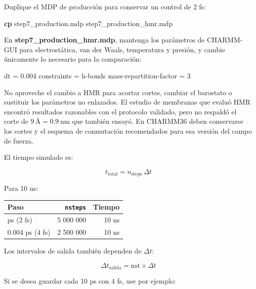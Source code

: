 \documentclass[
  spanish,
  11pt,
  a4paper]{article}
\newenvironment{Shaded}{\begin{snugshade}}{\end{snugshade}}
\newcommand{\DataTypeTok}[1]{\textcolor[rgb]{0.13,0.29,0.53}{#1}}
\newcommand{\DecValTok}[1]{\textcolor[rgb]{0.00,0.00,0.81}{#1}}
\newcommand{\FloatTok}[1]{\textcolor[rgb]{0.00,0.00,0.81}{#1}}
\newcommand{\FunctionTok}[1]{\textcolor[rgb]{0.13,0.29,0.53}{\textbf{#1}}}
\newcommand{\NormalTok}[1]{#1}
\newcommand{\OtherTok}[1]{\textcolor[rgb]{0.56,0.35,0.01}{#1}}
\newcommand{\StringTok}[1]{\textcolor[rgb]{0.31,0.60,0.02}{#1}}
\newcounter{none} %
\begin{document}
Duplique el MDP de producción para conservar un control de 2 fs:

\begin{Shaded}
\begin{Highlighting}[]
\FunctionTok{cp}\NormalTok{ step7\_production.mdp step7\_production\_hmr.mdp}
\end{Highlighting}
\end{Shaded}

En \textbf{step7\_production\_hmr.mdp}, mantenga los parámetros de
CHARMM-GUI para electrostática, van der Waals, temperatura y presión, y
cambie únicamente lo necesario para la comparación:

\begin{Shaded}
\begin{Highlighting}[]
\DataTypeTok{dt                      }\OtherTok{=}\StringTok{ }\FloatTok{0.004}
\DataTypeTok{constraints             }\OtherTok{=}\StringTok{ h{-}bonds}
\DataTypeTok{mass{-}repartition{-}factor }\OtherTok{=}\StringTok{ }\DecValTok{3}
\end{Highlighting}
\end{Shaded}

No aproveche el cambio a HMR para acortar cortes, cambiar el barostato o
sustituir los parámetros no enlazados. El estudio de membranas que
evaluó HMR encontró resultados razonables con el protocolo validado,
pero no respaldó el corte de \(9\ \text{Å}=0.9\ \mathrm{nm}\) que
también ensayó. En CHARMM36 deben conservarse los cortes y el esquema de
conmutación recomendados para esa versión del campo de fuerza.

El tiempo simulado es:

\[
t_{\mathrm{total}}=n_{\mathrm{steps}}\,\Delta t
\]

Para 10 ns:

{\def\LTcaptype{none} %
\begin{longtable}[]{@{}lrr@{}}
\toprule\noalign{}
Paso & \texttt{nsteps} & Tiempo \\
\midrule\noalign{}
\endhead
\bottomrule\noalign{}
\endlastfoot
0.002 ps (2 fs) & 5 000 000 & 10 ns \\
0.004 ps (4 fs) & 2 500 000 & 10 ns \\
\end{longtable}
}

Los intervalos de salida también dependen de \(\Delta t\):

\[
\Delta t_{\mathrm{salida}}=\mathrm{nst}\times\Delta t
\]

Si se desea guardar cada 10 ps con 4 fs, use por ejemplo:
\end{document}
